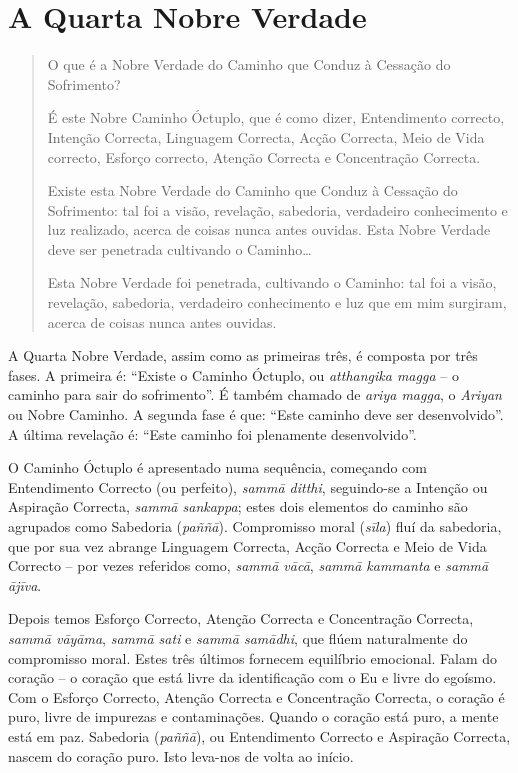 \chapter{A Quarta Nobre Verdade}

\begin{quote}
  O que é a Nobre Verdade do Caminho que Conduz à Cessação do Sofrimento?

  É este Nobre Caminho Óctuplo, que é como dizer, Entendimento correcto,
  Intenção Correcta, Linguagem Correcta, Acção Correcta, Meio de Vida correcto,
  Esforço correcto, Atenção Correcta e Concentração Correcta.

  Existe esta Nobre Verdade do Caminho que Conduz à Cessação do Sofrimento: tal
  foi a visão, revelação, sabedoria, verdadeiro conhecimento e luz realizado,
  acerca de coisas nunca antes ouvidas. Esta Nobre Verdade deve ser penetrada
  cultivando o Caminho\ldots{}

  Esta Nobre Verdade foi penetrada, cultivando o Caminho: tal foi a visão,
  revelação, sabedoria, verdadeiro conhecimento e luz que em mim surgiram,
  acerca de coisas nunca antes ouvidas.

\end{quote}

A Quarta Nobre Verdade, assim como as primeiras três, é composta por três fases.
A primeira é: “Existe o Caminho Óctuplo, ou \emph{atthangika magga} – o caminho
para sair do sofrimento”. É também chamado de \emph{ariya magga}, o
\emph{Ariyan} ou Nobre Caminho. A segunda fase é que: “Este caminho deve ser
desenvolvido”. A última revelação é: “Este caminho foi plenamente desenvolvido”.

O Caminho Óctuplo é apresentado numa sequência, começando com Entendimento
Correcto (ou perfeito), \emph{sammā ditthi}, seguindo-se a Intenção ou Aspiração
Correcta, \emph{sammā sankappa}; estes dois elementos do caminho são agrupados
como Sabedoria (\emph{paññā}). Compromisso moral (\emph{sīla}) fluí da
sabedoria, que por sua vez abrange Linguagem Correcta, Acção Correcta e Meio de
Vida Correcto – por vezes referidos como, \emph{sammā vācā}, \emph{sammā
  kammanta} e \emph{sammā ājīva}.

Depois temos Esforço Correcto, Atenção Correcta e Concentração Correcta,
\emph{sammā vāyāma}, \emph{sammā sati} e \emph{sammā samādhi}, que flúem
naturalmente do compromisso moral. Estes três últimos fornecem equilíbrio
emocional. Falam do coração – o coração que está livre da identificação com o Eu
e livre do egoísmo. Com o Esforço Correcto, Atenção Correcta e Concentração
Correcta, o coração é puro, livre de impurezas e contaminações. Quando o coração
está puro, a mente está em paz. Sabedoria (\emph{paññā}), ou Entendimento
Correcto e Aspiração Correcta, nascem do coração puro. Isto leva-nos de volta ao
início.

